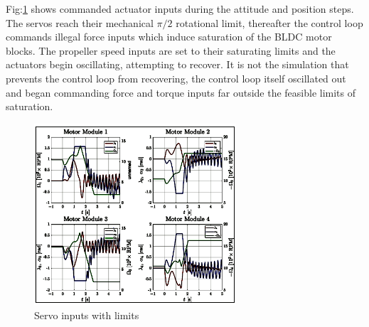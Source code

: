\par
Fig:\ref{fig:saturated-servos} shows commanded actuator inputs during the attitude and position steps. The servos reach their mechanical $\pi/2$ rotational limit, thereafter the control loop commands illegal force inputs which induce saturation of the BLDC motor blocks. The propeller speed inputs are set to their saturating limits and the actuators begin oscillating, attempting to recover. It is not the simulation that prevents the control loop from recovering, the control loop itself oscillated out and began commanding force and torque inputs far outside the feasible limits of saturation.
\begin{figure}[hbtp]
\vspace{-8pt}
\centering
\includegraphics[width=0.67\textwidth]{graphs/saturated-servos}
\vspace{-6pt}
\caption{Servo inputs with limits}
\label{fig:saturated-servos}
\vspace{-14pt}
\end{figure}
